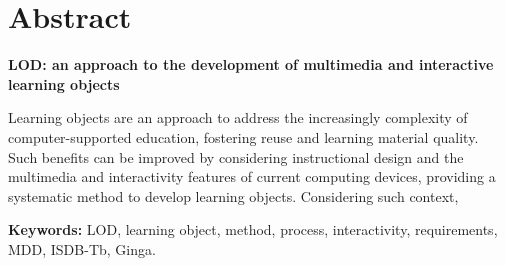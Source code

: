 \chapter*{Abstract}

\textbf{LOD: an approach to the development of multimedia and interactive
learning objects}

\vspace{1cm}
\noindent
Learning objects are an approach to address the increasingly complexity
of computer-supported education, fostering reuse and learning material quality.
Such benefits can be improved by considering instructional design and the
multimedia and interactivity features of current computing devices, providing
a systematic method to develop learning objects. Considering such context,

\vspace{1cm}
\noindent
\textbf{Keywords:} LOD, learning object, method, process, interactivity,
requirements, MDD, ISDB-Tb, Ginga.
